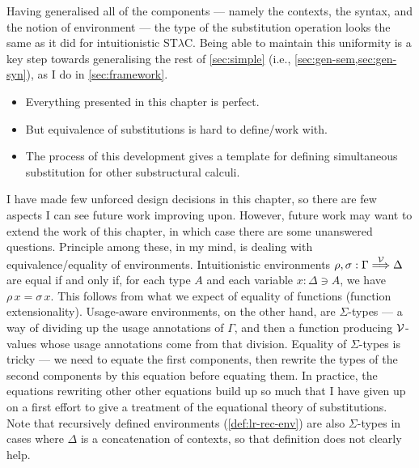 Having generalised all of the components --- namely the contexts, the syntax,
and the notion of environment --- the type of the substitution operation looks
the same as it did for intuitionistic ST$\lambda$C\@.
Being able to maintain this uniformity is a key step towards generalising the
rest of \cref{sec:simple} (i.e., \cref{sec:gen-sem,sec:gen-syn}), as I do in
\cref{sec:framework}.

\begin{itemize}
  \item Everything presented in this chapter is perfect.
  \item But equivalence of substitutions is hard to define/work with.
  \item The process of this development gives a template for defining
    simultaneous substitution for other substructural calculi.
\end{itemize}

I have made few unforced design decisions in this chapter, so there are few
aspects I can see future work improving upon.
However, future work may want to extend the work of this chapter, in which case
there are some unanswered questions.
Principle among these, in my mind, is dealing with equivalence/equality of
environments.
Intuitionistic environments $\rho, \sigma : \Gamma \stackrel{\mathcal V}\Longrightarrow \Delta$ are equal
if and only if, for each type $A$ and each variable $x : \Delta \ni A$, we have
$\rho\,x = \sigma\,x$.
This follows from what we expect of equality of functions (function
extensionality).
Usage-aware environments, on the other hand, are $\Sigma$-types --- a way of
dividing up the usage annotations of $\Gamma$, and then a function producing
$\mathcal V$-values whose usage annotations come from that division.
Equality of $\Sigma$-types is tricky --- we need to equate the first components,
then rewrite the types of the second components by this equation before equating
them.
In practice, the equations rewriting other other equations build up so much that
I have given up on a first effort to give a treatment of the equational theory
of substitutions.
Note that recursively defined environments (\cref{def:lr-rec-env}) are also
$\Sigma$-types in cases where $\Delta$ is a concatenation of contexts, so that
definition does not clearly help.
